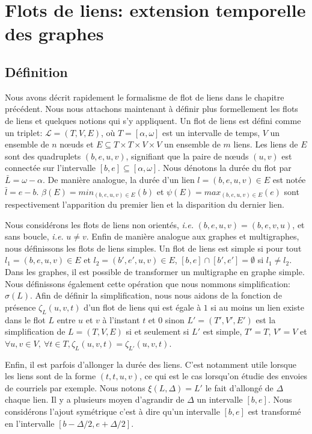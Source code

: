 \chapter{Flots de liens: extension temporelle des graphes}
\minitoc
\label{chap:def_flot}

\section{Définition}
\label{sec:definition}

Nous avons décrit rapidement le formalisme de flot de liens dans le chapitre précédent.
Nous nous attachons maintenant à définir plus formellement les flots de liens et quelques notions qui s'y appliquent.
Un flot de liens est défini comme un triplet: $\mathcal{L}=(T,V,E)$, où $T=[\alpha, \omega]$ est un intervalle de temps, $V$ un ensemble de $n$ n\oe uds et $E\subseteq T\times T \times V \times V$ un ensemble de $m$ liens.
Les liens de $E$ sont des quadruplets $(b,e,u,v)$, signifiant que la paire de n\oe uds $(u, v)$ est connectée sur l'intervalle $[b,e] \subseteq [\alpha,\omega]$.
Nous dénotons la durée du flot par $\bar{L}=\omega-\alpha$.
De manière analogue, la durée d'un lien $l=(b,e,u,v) \in E$ est notée   $\bar{l}=e-b$.
$\beta(E)= min_{(b,e,u,v) \in E} (b)$ et $\psi(E)= max_{(b,e,u,v) \in E} (e)$ sont respectivement l'apparition du premier lien et la disparition du dernier lien.

Nous considérons les flots de liens non orientés, \emph{i.e.} $(b,e,u,v)=(b,e,v,u)$, et sans boucle, \emph{i.e.} $u \neq v$.
Enfin de manière analogue aux graphes et multigraphes, nous définissons les flots de liens simples.
Un flot de liens est simple si pour tout $l_1=(b,e,u,v) \in E$ et $l_2=(b',e',u, v) \in E$, $[b,e]\cap [b', e'] = \emptyset$ si $l_1 \neq l_2$.
Dans les graphes, il est possible de transformer un multigraphe en graphe simple.
Nous définissons également cette opération que nous nommons simplification: $\sigma(L)$.
Afin de définir la simplification, nous nous aidons de la fonction de présence $\zeta_{L}(u,v,t)$ d'un flot de liens qui est égale à $1$ si au moins un lien existe dans le flot $L$ entre $u$ et $v$ à l'instant $t$ et $0$ sinon
$L'=(T',V',E')$ est la simplification de $L=(T,V,E)$ si et seulement si $L'$ est simple, $T'=T$, $V'=V$ et $\forall u,v \in V,\ \forall t\in T, \zeta_{L}(u,v,t)= \zeta_{L'}(u,v,t)$.

Enfin, il est parfois d'allonger la durée des liens.
C'est notamment utile lorsque les liens sont de la forme $(t,t,u,v)$, ce qui est le cas lorsqu'on étudie des envoies de courriels par exemple.
Nous notons $\xi(L,\Delta)=L'$ le fait d'allongé de $\Delta$ chaque lien.
Il y a plusieurs moyen d'agrandir de $\Delta$ un intervalle $[b,e]$.
Nous considérons l'ajout symétrique c'est à dire qu'un intervalle $[b,e]$ est transformé en l'intervalle $[b-\Delta/2,e+\Delta/2]$.

